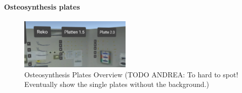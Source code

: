 \paragraph{Osteosynthesis plates}

\begin{figure}[ht]
    \centering
    \includegraphics[width=200px]{images/implementation/features/procedures/metal_plates_1.png}
    \caption{\label{fig::FeatureMetalPlate} Osteosynthesis Plates Overview (TODO ANDREA: To hard to spot! Eventually show the single plates without the background.)}
\end{figure}

